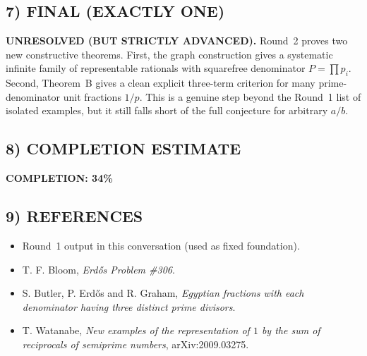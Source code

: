 \subsection*{7) FINAL (EXACTLY ONE)}
\textbf{UNRESOLVED (BUT STRICTLY ADVANCED).}
Round~2 proves two new constructive theorems.
First, the graph construction gives a systematic infinite family of representable rationals with squarefree denominator \(P=\prod p_i\).
Second, Theorem~B gives a clean explicit three-term criterion for many prime-denominator unit fractions \(1/p\).
This is a genuine step beyond the Round~1 list of isolated examples, but it still falls short of the full conjecture for arbitrary \(a/b\).

\subsection*{8) COMPLETION ESTIMATE}
\textbf{COMPLETION: 34\%}

\subsection*{9) REFERENCES}
\begin{itemize}
\item Round~1 output in this conversation (used as fixed foundation).
\item T. F. Bloom, \emph{Erd\H{o}s Problem \#306}.
\item S. Butler, P. Erd\H{o}s and R. Graham, \emph{Egyptian fractions with each denominator having three distinct prime divisors}.
\item T. Watanabe, \emph{New examples of the representation of \(1\) by the sum of reciprocals of semiprime numbers}, arXiv:2009.03275.
\end{itemize}
